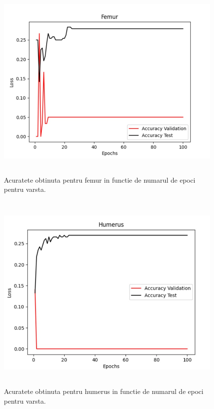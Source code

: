 \documentclass[runningheads,a4paper,11pt]{report}
\begin{document}
\begin{figure}[h!]
\centerline{
\includegraphics[height=10cm]{Imagini/femur_acc_age.png}}
\caption{Acuratete obtinuta pentru femur in functie de numarul de epoci pentru varsta.}
\label{fig}
\end{figure}

\begin{figure}[h!]
\centerline{
\includegraphics[height=10cm]{Imagini/humerus_acc_age.png}}
\caption{Acuratete obtinuta pentru humerus in functie de numarul de epoci pentru varsta.}
\label{fig}
\end{figure}
\end{document}
